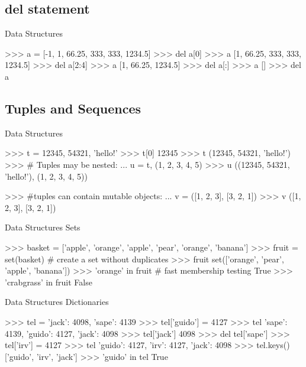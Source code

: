 \documentclass[11pt]{beamer}
\begin{document}
\subsection{del statement}
\begin{frame}[containsverbatim]{Data Structures}
\begin{python}
>>> a = [-1, 1, 66.25, 333, 333, 1234.5]
>>> del a[0]
>>> a
[1, 66.25, 333, 333, 1234.5]
>>> del a[2:4]
>>> a
[1, 66.25, 1234.5]
>>> del a[:]
>>> a
[]
>>> del a
\end{python}
\end{frame}

\subsection{Tuples and Sequences}
\begin{frame}[containsverbatim]{Data Structures}
\begin{python}
>>> t = 12345, 54321, 'hello!'
>>> t[0]
12345
>>> t
(12345, 54321, 'hello!')
>>> # Tuples may be nested:
... u = t, (1, 2, 3, 4, 5)
>>> u
((12345, 54321, 'hello!'), (1, 2, 3, 4, 5))

>>> #tuples can contain mutable objects:
... v = ([1, 2, 3], [3, 2, 1])
>>> v
([1, 2, 3], [3, 2, 1])
\end{python}
\end{frame}


\begin{frame}[containsverbatim]{Data Structures}
Sets
\begin{python}
>>> basket = ['apple', 'orange', 'apple', 'pear', 'orange', 'banana']
>>> fruit = set(basket)       # create a set without duplicates
>>> fruit
set(['orange', 'pear', 'apple', 'banana'])
>>> 'orange' in fruit                 # fast membership testing
True
>>> 'crabgrass' in fruit
False

\end{python}
\end{frame}


\begin{frame}[containsverbatim]{Data Structures}
Dictionaries
\begin{python}
>>> tel = {'jack': 4098, 'sape': 4139}
>>> tel['guido'] = 4127
>>> tel
{'sape': 4139, 'guido': 4127, 'jack': 4098}
>>> tel['jack']
4098
>>> del tel['sape']
>>> tel['irv'] = 4127
>>> tel
{'guido': 4127, 'irv': 4127, 'jack': 4098}
>>> tel.keys()
['guido', 'irv', 'jack']
>>> 'guido' in tel
True
\end{python}
\end{frame}
\end{document}
